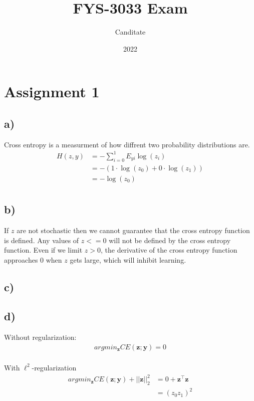 \documentclass{article}
\title{FYS-3033 Exam}
\author{Canditate}
\date{2022}
\begin{document}
\maketitle
\section{Assignment 1}
\subsection*{a)}
Cross entropy is a measurment of how diffrent two probability distributions are.
\begin{equation}
    \begin{split}
        H(z,y) &= -\sum_{i=0}^1 E_{yi}\log(z_i)\\
        &= -\left(1\cdot\log(z_0)+0\cdot\log(z_1)\right)\\
        &= -\log(z_0)\\    
    \end{split}
\end{equation}

\subsection*{b)}
If $z$ are not stochastic then we cannot guarantee that the cross entropy function is defined. Any values of $z <= 0$ will not be defined by the cross entropy function. Even if we limit $z > 0$, the derivative of the cross entropy function approaches $0$ when $z$ gets large, which will inhibit learning.

\subsection*{c)}
\subsection*{d)}

Without regularization:
\begin{equation}
    \begin{split}
        argmin_\mathbf{z} CE(\mathbf{z}; \mathbf{y}) = 0\\
    \end{split}
\end{equation}

With $\ell^2$-regularization
\begin{equation}
    \begin{split}
        argmin_\mathbf{z} CE(\mathbf{z}; \mathbf{y}) + ||\mathbf{z}||^2_2 &= 0 + \mathbf{z}^\top\mathbf{z}\\
                                                                          &= (z_0z_1)^2
    \end{split}
\end{equation}
\end{document}
